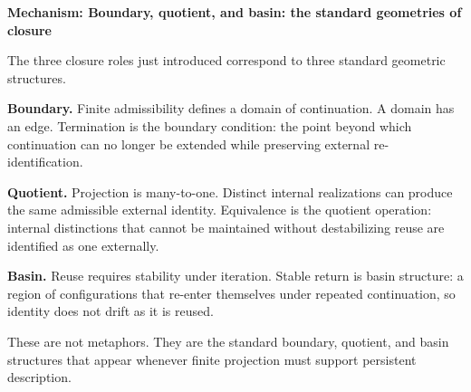 \documentclass[11pt,twoside,openright]{book}
\newenvironment{mechanismbox}[1]
  {\begin{framed}\noindent\textbf{Mechanism: #1}\par\medskip}
  {\end{framed}}
\begin{document}
\begin{mechanismbox}{Boundary, quotient, and basin: the standard geometries of closure}

The three closure roles just introduced correspond to three standard geometric structures.

\textbf{Boundary.}
Finite admissibility defines a domain of continuation.
A domain has an edge.
Termination is the boundary condition:
the point beyond which continuation can no longer be extended
while preserving external re-identification.

\textbf{Quotient.}
Projection is many-to-one.
Distinct internal realizations can produce the same admissible external identity.
Equivalence is the quotient operation:
internal distinctions that cannot be maintained without destabilizing reuse
are identified as one externally.

\textbf{Basin.}
Reuse requires stability under iteration.
Stable return is basin structure:
a region of configurations that re-enter themselves under repeated continuation,
so identity does not drift as it is reused.

These are not metaphors. They are the standard boundary, quotient, and basin structures that appear whenever finite projection must support persistent description.

\end{mechanismbox}
\end{document}
